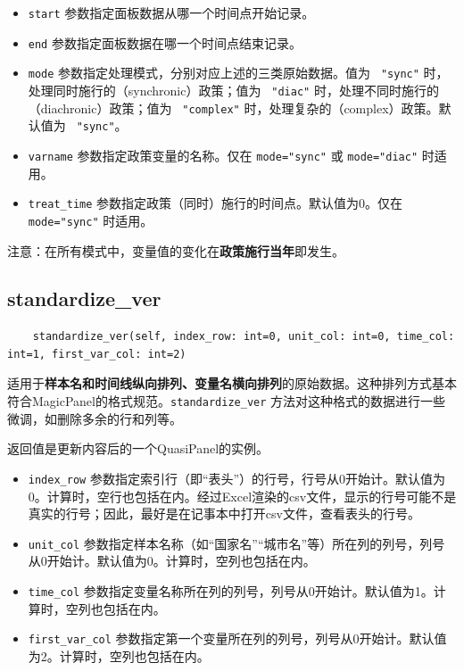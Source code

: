 \documentclass[a4paper, UTF8, fontset=none]{ctexart}
\begin{document}
    \begin{itemize}
        \item \verb|start| 参数指定面板数据从哪一个时间点开始记录。
        \item \verb|end| 参数指定面板数据在哪一个时间点结束记录。
        \item \verb|mode| 参数指定处理模式，分别对应上述的三类原始数据。值为 \verb| "sync"| 时，处理同时施行的（synchronic）政策；值为 \verb| "diac"| 时，处理不同时施行的（diachronic）政策；值为 \verb| "complex"| 时，处理复杂的（complex）政策。默认值为 \verb| "sync"|。
        \item \verb|varname| 参数指定政策变量的名称。仅在 \verb|mode="sync"| 或 \verb|mode="diac"| 时适用。
        \item \verb|treat_time| 参数指定政策（同时）施行的时间点。默认值为0。仅在 \verb|mode="sync"| 时适用。
    \end{itemize}

    注意：在所有模式中，变量值的变化在\textbf{政策施行当年}即发生。

\subsection{standardize\_ver}

    \begin{lstlisting}
    standardize_ver(self, index_row: int=0, unit_col: int=0, time_col: int=1, first_var_col: int=2)
    \end{lstlisting}    

    适用于\textbf{样本名和时间线纵向排列、变量名横向排列}的原始数据。这种排列方式基本符合MagicPanel的格式规范。\verb|standardize_ver| 方法对这种格式的数据进行一些微调，如删除多余的行和列等。

    返回值是更新内容后的一个QuasiPanel的实例。

    \begin{itemize}
        \item \verb|index_row| 参数指定索引行（即“表头”）的行号，行号从0开始计。默认值为0。计算时，空行也包括在内。经过Excel渲染的csv文件，显示的行号可能不是真实的行号；因此，最好是在记事本中打开csv文件，查看表头的行号。
        \item \verb|unit_col| 参数指定样本名称（如“国家名”“城市名”等）所在列的列号，列号从0开始计。默认值为0。计算时，空列也包括在内。
        \item \verb|time_col| 参数指定变量名称所在列的列号，列号从0开始计。默认值为1。计算时，空列也包括在内。
        \item \verb|first_var_col| 参数指定第一个变量所在列的列号，列号从0开始计。默认值为2。计算时，空列也包括在内。
    \end{itemize}
\end{document}
